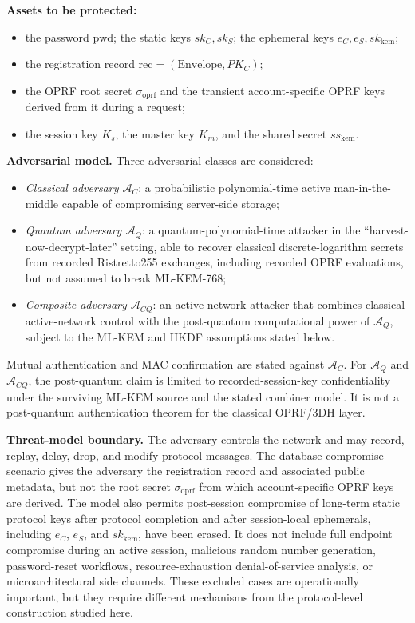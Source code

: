 \documentclass[preprint,12pt]{elsarticle}
\newcommand{\sigoprf}{\sigma_{\mathrm{oprf}}}
\theoremstyle{remark}
\begin{document}
\textbf{Assets to be protected:}
\begin{itemize}
  \item the password $\mathrm{pwd}$; the static keys $sk_C, sk_S$; the
        ephemeral keys $e_C, e_S, sk_{\mathrm{kem}}$;
  \item the registration record
        $\mathrm{rec} = (\mathrm{Envelope}, PK_C)$;
  \item the OPRF root secret $\sigoprf$ and the transient
        account-specific OPRF keys derived from it during a request;
  \item the session key $K_s$, the master key $K_m$, and the shared
        secret $ss_{\mathrm{kem}}$.
\end{itemize}

\textbf{Adversarial model.} Three adversarial classes are considered:
\begin{itemize}
  \item \emph{Classical adversary $\mathcal{A}_C$}: a
        probabilistic polynomial-time active man-in-the-middle capable
        of compromising server-side storage;
  \item \emph{Quantum adversary $\mathcal{A}_Q$}: a
        quantum-polynomial-time attacker in the
        ``harvest-now-decrypt-later'' setting, able to recover classical
        discrete-logarithm secrets from recorded Ristretto255 exchanges,
        including recorded OPRF evaluations, but not assumed to break
        ML-KEM-768;
  \item \emph{Composite adversary $\mathcal{A}_{CQ}$}: an active
        network attacker that combines classical active-network control
        with the post-quantum computational power of $\mathcal{A}_Q$,
        subject to the ML-KEM and HKDF assumptions stated below.
\end{itemize}

Mutual authentication and MAC confirmation are stated against
$\mathcal{A}_C$. For $\mathcal{A}_Q$ and $\mathcal{A}_{CQ}$, the
post-quantum claim is limited to recorded-session-key confidentiality under
the surviving ML-KEM source and the stated combiner model. It is not a
post-quantum authentication theorem for the classical OPRF/3DH layer.

\textbf{Threat-model boundary.} The adversary controls the network and
may record, replay, delay, drop, and modify protocol messages. The
database-compromise scenario gives the adversary the registration
record and associated public metadata, but not the root secret
$\sigoprf$ from which account-specific OPRF keys are derived. The model
also permits post-session compromise of long-term static protocol keys
after protocol completion and after session-local ephemerals, including
$e_C$, $e_S$, and $sk_{\mathrm{kem}}$, have been erased. It does not include
full endpoint compromise during an active session, malicious random
number generation, password-reset workflows, resource-exhaustion
denial-of-service analysis, or microarchitectural side channels. These
excluded cases are operationally important, but they require different
mechanisms from the protocol-level construction studied here.
\end{document}
